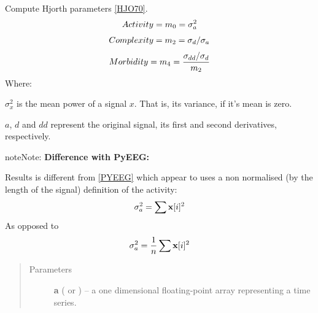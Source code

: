 \documentclass[letterpaper,10pt,english]{sphinxmanual}
\begin{document}
\begin{fulllineitems}
\label{pyrem.univariate:pyrem.univariate.hjorth}
Compute Hjorth parameters {\hyperref[pyrem.univariate:hjo70]{{[}HJO70{]}}}.
\begin{gather}
\begin{split}Activity = m_0 = \sigma_{a}^2\end{split}\notag
\end{gather}\begin{gather}
\begin{split}Complexity = m_2 = \sigma_{d}/ \sigma_{a}\end{split}\notag
\end{gather}\begin{gather}
\begin{split}Morbidity = m_4 =  \frac{\sigma_{dd}/ \sigma_{d}}{m_2}\end{split}\notag
\end{gather}
Where:

\(\sigma_{x}^2\) is the mean power of a signal \(x\). That is, its variance, if it's mean is zero.

\(a\), \(d\) and \(dd\) represent the original signal, its first and second derivatives, respectively.

\begin{notice}{note}{Note:}
\textbf{Difference with PyEEG:}

Results is different from {\hyperref[pyrem.univariate:pyeeg]{{[}PYEEG{]}}} which appear to uses a non normalised (by the length of the signal) definition of the activity:
\begin{gather}
\begin{split}\sigma_{a}^2 = \sum{\mathbf{x}[i]^2}\end{split}\notag
\end{gather}
As opposed to
\begin{gather}
\begin{split}\sigma_{a}^2 = \frac{1}{n}\sum{\mathbf{x}[i]^2}\end{split}\notag
\end{gather}\end{notice}
\begin{quote}\begin{description}
\item[{Parameters}] \leavevmode
\textbf{a} (\href{http://docs.scipy.org/doc/numpy/reference/generated/numpy.ndarray.html\#numpy.ndarray}{} or {\hyperref[pyrem.time_series:pyrem.time_series.Signal]{}}) -- a one dimensional floating-point array representing a time series.


\end{description}
\end{quote}
\end{fulllineitems}
\end{document}
